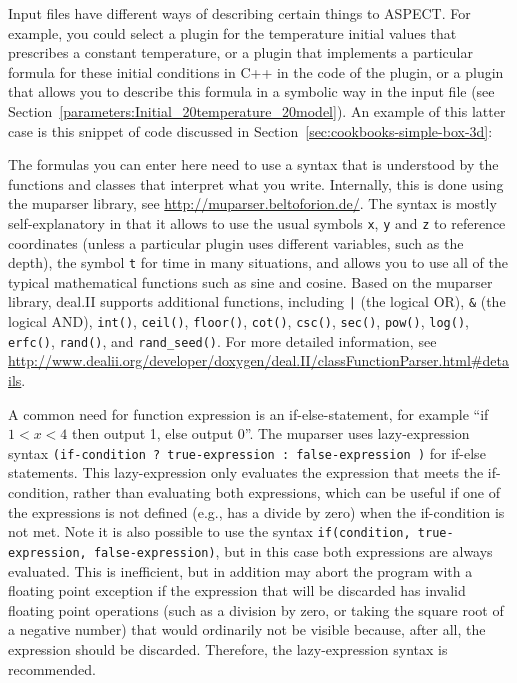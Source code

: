 \documentclass{article}
\newcommand{\aspect}{\textsc{ASPECT}}
\begin{document}
Input files have different ways of describing certain things to \aspect{}. For
example, you could select a plugin for the temperature initial values that
prescribes a constant temperature, or a
plugin that implements a particular formula for these initial conditions in
C++ in the code of the plugin, or a
plugin that allows you to describe this formula in a symbolic way in the input file
(see Section~\ref{parameters:Initial_20temperature_20model}). An example of this latter
case is this snippet of code discussed in
Section~\ref{sec:cookbooks-simple-box-3d}:
%

%
The formulas you can enter here need to use a syntax that is understood by the
functions and classes that interpret what you write. Internally, this is done
using the muparser library, see \url{http://muparser.beltoforion.de/}. The
syntax is mostly self-explanatory in that it allows to use the usual symbols
\texttt{x}, \texttt{y} and \texttt{z} to reference coordinates (unless a
particular plugin uses different variables, such as the depth), the symbol
\texttt{t} for time in many situations, and allows you to use all of the
typical mathematical functions such as sine and cosine. Based on the muparser 
library, deal.II supports additional functions, including \texttt{|} (the logical OR), \texttt{\&} (the logical AND),
\texttt{int()}, \texttt{ceil()}, \texttt{floor()}, \texttt{cot()}, 
\texttt{csc()}, \texttt{sec()}, \texttt{pow()}, \texttt{log()}, 
\texttt{erfc()}, \texttt{rand()}, and \texttt{rand\_seed()}. 
For more detailed information, see 
\url{http://www.dealii.org/developer/doxygen/deal.II/classFunctionParser.html#details}.

A common need for function expression is an if-else-statement, for example 
``if $1<x<4$ then output 1, else output 0''.
The muparser uses lazy-expression syntax \texttt{(if-condition ?\ true-expression :\ false-expression )}
for if-else statements. This lazy-expression only evaluates the expression that meets the
if-condition, rather than evaluating both expressions, which can be useful if one of the
expressions is not defined (e.g., has a divide by zero) when the if-condition is not met.
Note it is also possible to use the syntax \texttt{if(condition, true-expression, false-expression)},
but in this case both expressions are always evaluated. This is inefficient, but in addition may abort the program with a floating point exception if the expression that will be discarded has invalid floating point operations (such as a division by zero, or taking the square root of a negative number) that would ordinarily not be visible because, after all, the expression should be discarded.
Therefore, the lazy-expression syntax is recommended.
\end{document}
